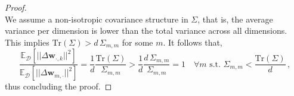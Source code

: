 \begin{proof}
\begin{equation}
\end{equation}
%
We assume a non-isotropic covariance structure in $\Sigma$, that is, the average variance per dimension is lower than the total variance across all dimensions.
%
This implies $\text{Tr}(\Sigma) > d\,\Sigma_{m,m}$ for some $m$.
%
It follows that,
%
\begin{equation}
\frac{\mathbb{E}_{\mathcal{D}}\left[ ||\Delta \bm{w}_{\cdot, k}||^2 \right]}{\mathbb{E}_{\mathcal{D}}\left[ ||\Delta \bm{w}_{m, \cdot}||^2 \right]} = \frac{1}{d}\frac{\text{Tr}(\Sigma)}{\Sigma_{m,m}}  > \frac{1}{d}\frac{d \,\Sigma_{m,m}}{\Sigma_{m,m}} = 1 \quad \forall m \,\,\text{s.t.}\,\,\Sigma_{m,m} < \frac{\text{Tr}(\Sigma)}{d}\,,
\end{equation}
%
thus concluding the proof.
%
\end{proof}